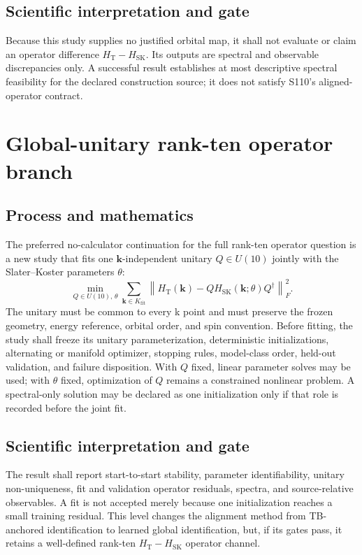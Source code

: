 \documentclass[11pt]{report}
\begin{document}
\section{Scientific interpretation and gate}

Because this study supplies no justified orbital map, it shall not evaluate or claim an
operator difference $H_{\mathrm{T}}-H_{\mathrm{SK}}$.  Its outputs are spectral and
observable discrepancies only.  A successful result establishes at most descriptive
spectral feasibility for the declared construction source; it does not satisfy S110's
aligned-operator contract.

\chapter{Global-unitary rank-ten operator branch}

\section{Process and mathematics}

The preferred no-calculator continuation for the full rank-ten operator question is a
new study that fits one $\mathbf{k}$-independent unitary $Q\in U(10)$ jointly with the
Slater--Koster parameters $\theta$:
\begin{equation}
 \min_{Q\in U(10),\,\theta}
 \sum_{\mathbf{k}\in K_{\mathrm{fit}}}
 \left\|
 H_{\mathrm{T}}(\mathbf{k})-
 QH_{\mathrm{SK}}(\mathbf{k};\theta)Q^{\dagger}
 \right\|_{F}^{2}.
\end{equation}
The unitary must be common to every k point and must preserve the frozen geometry,
energy reference, orbital order, and spin convention.  Before fitting, the study shall
freeze its unitary parameterization, deterministic initializations, alternating or
manifold optimizer, stopping rules, model-class order, held-out validation, and failure
disposition.  With $Q$ fixed, linear parameter solves may be used; with $\theta$ fixed,
optimization of $Q$ remains a constrained nonlinear problem.  A spectral-only solution
may be declared as one initialization only if that role is recorded before the joint
fit.

\section{Scientific interpretation and gate}

The result shall report start-to-start stability, parameter identifiability, unitary
non-uniqueness, fit and validation operator residuals, spectra, and source-relative
observables.  A fit is not accepted merely because one initialization reaches a small
training residual.  This level changes the alignment method from TB-anchored
identification to learned global identification, but, if its gates pass, it retains a
well-defined rank-ten $H_{\mathrm{T}}-H_{\mathrm{SK}}$ operator channel.
\end{document}
